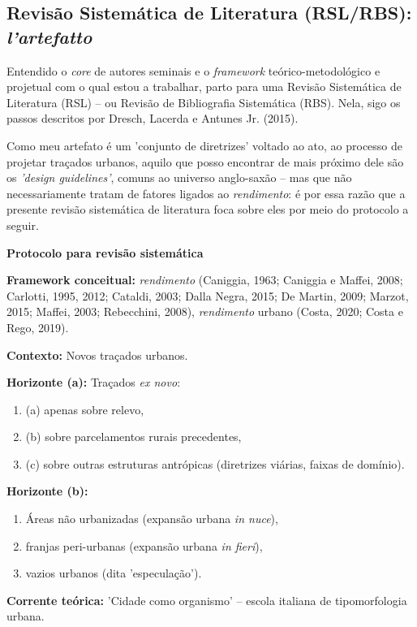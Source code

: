 \documentclass[]{report}
\begin{document}
		\subsection{Revisão Sistemática de Literatura (RSL/RBS): \textit{l'artefatto}}
			Entendido o \textit{core} de autores seminais e o \textit{framework} teórico-metodológico e projetual com o qual estou a trabalhar, parto para uma Revisão Sistemática de Literatura (RSL) – ou Revisão de Bibliografia Sistemática (RBS). Nela, sigo os passos descritos por Dresch, Lacerda e Antunes Jr. (2015).

			Como meu artefato é um 'conjunto de diretrizes' voltado ao ato, ao processo de projetar traçados urbanos, aquilo que posso encontrar de mais próximo dele são os \textit{'design guidelines'}, comuns ao universo anglo-saxão – mas que não necessariamente tratam de fatores ligados ao \textit{rendimento}: é por essa razão que a presente revisão sistemática de literatura foca sobre eles por meio do protocolo a seguir.

			\textbf{Protocolo para revisão sistemática}

				\textbf{Framework conceitual:} \textit{rendimento} (Caniggia, 1963; Caniggia e Maffei, 2008; Carlotti, 1995, 2012; Cataldi, 2003; Dalla Negra, 2015; De Martin, 2009; Marzot, 2015; Maffei, 2003; Rebecchini, 2008), \textit{rendimento} urbano (Costa, 2020; Costa e Rego, 2019).

				\textbf{Contexto:} Novos traçados urbanos.

				\textbf{Horizonte (a):} Traçados \textit{ex novo}: 
				\begin{enumerate}
					\item (a) apenas sobre relevo, 
					\item (b) sobre parcelamentos rurais precedentes, \item (c) sobre outras estruturas antrópicas (diretrizes viárias, faixas de domínio).
				\end{enumerate}

				\textbf{Horizonte (b):} 
				\begin{enumerate}
					\item Áreas não urbanizadas (expansão urbana \textit{in nuce}), 
					\item franjas peri-urbanas (expansão urbana \textit{in fieri}), 
					\item vazios urbanos (dita 'especulação').
				\end{enumerate}

				\textbf{Corrente teórica:} 'Cidade como organismo' – escola italiana de tipomorfologia urbana.
\end{document}
